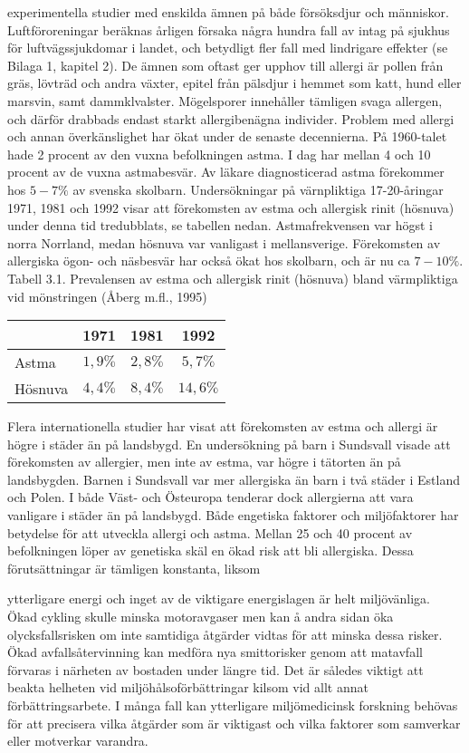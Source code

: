 experimentella studier med enskilda ämnen på både försöksdjur och människor. Luftföroreningar beräknas årligen försaka några hundra fall av intag på sjukhus för luftvägssjukdomar i landet, och betydligt fler fall med lindrigare effekter (se Bilaga 1, kapitel 2).
De ämnen som oftast ger upphov till allergi är pollen från gräs, lövträd och andra växter, epitel från pälsdjur i hemmet som katt, hund eller marsvin, samt dammklvalster. Mögelsporer innehåller tämligen svaga allergen, och därför drabbads endast starkt allergibenägna individer.
Problem med allergi och annan överkänslighet har ökat under de senaste decennierna. På 1960-talet hade 2 procent av den vuxna befolkningen astma. I dag har mellan 4 och 10 procent av de vuxna astmabesvär. Av läkare diagnosticerad astma förekommer hos \(5-7 \%\) av svenska skolbarn.
Undersökningar på värnpliktiga 17-20-åringar 1971, 1981 och 1992 visar att förekomsten av estma och allergisk rinit (hösnuva) under denna tid tredubblats, se tabellen nedan. Astmafrekvensen var högst i norra Norrland, medan hösnuva var vanligast i mellansverige. Förekomsten av allergiska ögon- och näsbesvär har också ökat hos skolbarn, och är nu ca \(7-10 \%\).
Tabell 3.1. Prevalensen av estma och allergisk rinit (hösnuva) bland värmpliktiga vid mönstringen (Åberg m.fl., 1995)
\begin{tabular}{lccc}
\hline & 1971 & 1981 & 1992 \\
\hline Astma & \(1,9 \%\) & \(2,8 \%\) & \(5,7 \%\) \\
Hösnuva & \(4,4 \%\) & \(8,4 \%\) & \(14,6 \%\) \\
\hline
\end{tabular}
Flera internationella studier har visat att förekomsten av estma och allergi är högre i städer än på landsbygd. En undersökning på barn i Sundsvall visade att förekomsten av allergier, men inte av estma, var högre i tätorten än på landsbygden. Barnen i Sundsvall var mer allergiska än barn i två städer i Estland och Polen. I både Väst- och Östeuropa tenderar dock allergierna att vara vanligare i städer än på landsbygd.
Både engetiska faktorer och miljöfaktorer har betydelse för att utveckla allergi och astma. Mellan 25 och 40 procent av befolkningen löper av genetiska skäl en ökad risk att bli allergiska. Dessa förutsättningar är tämligen konstanta, liksom

ytterligare energi och inget av de viktigare energislagen är helt miljövänliga. Ökad cykling skulle minska motoravgaser men kan å andra sidan öka olycksfallsrisken om inte samtidiga åtgärder vidtas för att minska dessa risker. Ökad avfallsåtervinning kan medföra nya smittorisker genom att matavfall förvaras i närheten av bostaden under längre tid. Det är således viktigt att beakta helheten vid miljöhålsoförbättringar kilsom vid allt annat förbättringsarbete. I många fall kan ytterligare miljömedicinsk forskning behövas för att precisera vilka åtgärder som är viktigast och vilka faktorer som samverkar eller motverkar varandra.
